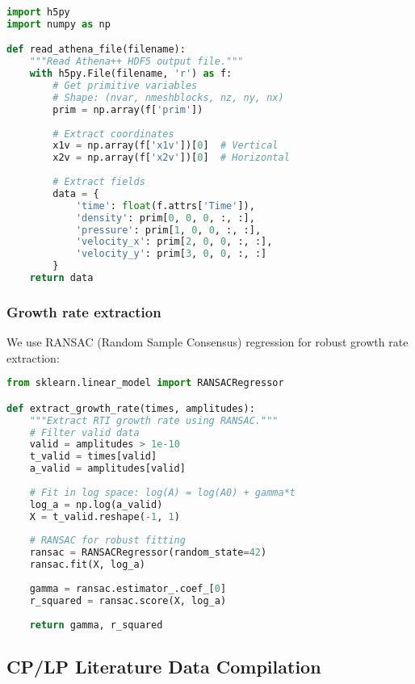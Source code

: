 \documentclass[aps,pre,twocolumn,superscriptaddress]{revtex4-2}
\begin{document}
\begin{lstlisting}[language=Python, caption=Athena++ data reading function]
import h5py
import numpy as np

def read_athena_file(filename):
    """Read Athena++ HDF5 output file."""
    with h5py.File(filename, 'r') as f:
        # Get primitive variables
        # Shape: (nvar, nmeshblocks, nz, ny, nx)
        prim = np.array(f['prim'])
        
        # Extract coordinates
        x1v = np.array(f['x1v'])[0]  # Vertical
        x2v = np.array(f['x2v'])[0]  # Horizontal
        
        # Extract fields
        data = {
            'time': float(f.attrs['Time']),
            'density': prim[0, 0, 0, :, :],
            'pressure': prim[1, 0, 0, :, :],
            'velocity_x': prim[2, 0, 0, :, :],
            'velocity_y': prim[3, 0, 0, :, :]
        }
    return data
\end{lstlisting}

\subsubsection{Growth rate extraction}

We use RANSAC (Random Sample Consensus) regression for robust growth rate extraction:

\begin{lstlisting}[language=Python, caption=Growth rate extraction with RANSAC]
from sklearn.linear_model import RANSACRegressor

def extract_growth_rate(times, amplitudes):
    """Extract RTI growth rate using RANSAC."""
    # Filter valid data
    valid = amplitudes > 1e-10
    t_valid = times[valid]
    a_valid = amplitudes[valid]
    
    # Fit in log space: log(A) = log(A0) + gamma*t
    log_a = np.log(a_valid)
    X = t_valid.reshape(-1, 1)
    
    # RANSAC for robust fitting
    ransac = RANSACRegressor(random_state=42)
    ransac.fit(X, log_a)
    
    gamma = ransac.estimator_.coef_[0]
    r_squared = ransac.score(X, log_a)
    
    return gamma, r_squared
\end{lstlisting}

\subsection{CP/LP Literature Data Compilation}
\end{document}
